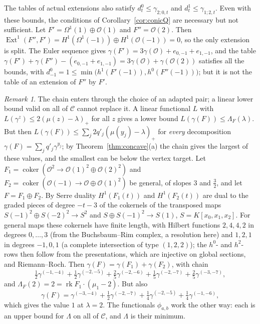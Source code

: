 \documentclass[11pt]{amsart}
\theoremstyle{definition}
\theoremstyle{remark}
\newtheorem{remark}[theorem]{Remark}
\newcommand{\OO}{\mathcal{O}}
\newcommand{\CC}{\mathcal{C}}
\DeclareMathOperator{\rk}{rk}
\DeclareMathOperator{\Ext}{Ext}
\DeclareMathOperator{\coker}{coker}
\begin{document}
The tables of actual extensions also satisfy $d^0_t\le\gamma_{2;0,t}$ and $d^1_t\le\gamma_{1;2,t}$. Even with these bounds, the conditions of Corollary~\ref{cor:conicQ} are necessary but not sufficient. Let $F'=\Omega^1(1)\oplus\OO(1)$ and $F''=\OO(2)$. Then $\Ext^1(F'',F')=H^1(\Omega^1(-1))\oplus H^1(\OO(-1))=0$, so the only extension is split. The Euler sequence gives $\gamma(F')=3\gamma(\OO)+e_{0,-1}+e_{1,-1}$, and the table $\gamma(F')+\gamma(F'')-(e_{0,-1}+e_{1,-1})=3\gamma(\OO)+\gamma(\OO(2))$ satisfies all the bounds, with $d^0_{-1}=1\le\min\big(h^1(F'(-1)),h^0(F''(-1))\big)$; but it is not the table of an extension of $F''$ by $F'$.

\begin{remark}\label{rem:linear}
The chain enters through the choice of an adapted pair; a linear lower bound valid on all of $\CC$ cannot replace it. A linear functional $L$ with $L(\gamma^z)\le2(\mu(z)-\lambda)_+$ for all $z$ gives a lower bound $L(\gamma(F))\le\Lambda_F(\lambda)$. But then $L(\gamma(F))\le\sum_j2q'_j(\mu(y_j)-\lambda)_+$ for \emph{every} decomposition $\gamma(F)=\sum_jq'_j\gamma^{y_j}$; by Theorem~\ref{thm:concave}(a) the chain gives the largest of these values, and the smallest can be below the vertex target. Let $F_1=\coker(\OO^2\to\OO(1)^2\oplus\OO(2)^2)$ and $F_2=\coker(\OO(-1)\to\OO\oplus\OO(1)^2)$ be general, of slopes $3$ and $\frac32$, and let $F=F_1\oplus F_2$. By Serre duality $H^1(F_1(t))$ and $H^1(F_2(t))$ are dual to the graded pieces of degree $-t-3$ of the cokernels of the transposed maps $S(-1)^2\oplus S(-2)^2\to S^2$ and $S\oplus S(-1)^2\to S(1)$, $S=K[x_0,x_1,x_2]$. For general maps these cokernels have finite length, with Hilbert functions $2,4,4,2$ in degrees $0,\dots,3$ (from the Buchsbaum--Rim complex, a resolution here) and $1,2,1$ in degrees $-1,0,1$ (a complete intersection of type $(1,2,2)$); the $h^0$- and $h^2$-rows then follow from the presentations, which are injective on global sections, and Riemann--Roch. Then $\gamma(F)=\gamma(F_1)+\gamma(F_2)$, with chain
\[
\tfrac12\gamma^{(-1,-4)}+\tfrac12\gamma^{(-2,-5)}+\tfrac25\gamma^{(-2,-6)}+\tfrac15\gamma^{(-2,-7)}+\tfrac25\gamma^{(-3,-7)},
\]
and $\Lambda_F(2)=2=\rk F_1\cdot(\mu_1-2)$. But also
\[
\gamma(F)=\gamma^{(-3,-4)}+\tfrac12\gamma^{(-2,-7)}+\tfrac14\gamma^{(-2,-5)}+\tfrac14\gamma^{(-1,-6)},
\]
which gives the value $1$ at $\lambda=2$. The functionals $\phi_{a,b}$ work the other way: each is an upper bound for $\Lambda$ on all of $\CC$, and $\Lambda$ is their minimum.
\end{remark}
\end{document}
